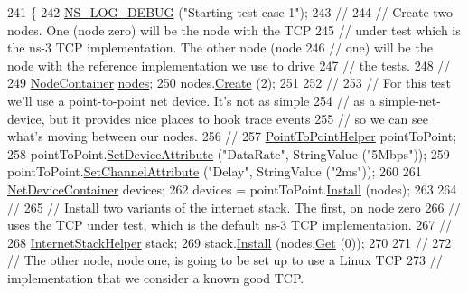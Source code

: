 \begin{DoxyCode}
241 \{
242   \hyperlink{group__logging_ga413f1886406d49f59a6a0a89b77b4d0a}{NS\_LOG\_DEBUG} (\textcolor{stringliteral}{"Starting test case 1"});
243   \textcolor{comment}{//}
244   \textcolor{comment}{// Create two nodes.  One (node zero) will be the node with the TCP}
245   \textcolor{comment}{// under test which is the ns-3 TCP implementation.  The other node (node}
246   \textcolor{comment}{// one) will be the node with the reference implementation we use to drive}
247   \textcolor{comment}{// the tests.}
248   \textcolor{comment}{//}
249   \hyperlink{classns3_1_1NodeContainer}{NodeContainer} \hyperlink{visualizer-ideas_8txt_a3e1b3808014a2c68ab0cd0182e041be2}{nodes};
250   nodes.\hyperlink{classns3_1_1NodeContainer_a787f059e2813e8b951cc6914d11dfe69}{Create} (2);
251 
252   \textcolor{comment}{//}
253   \textcolor{comment}{// For this test we'll use a point-to-point net device.  It's not as simple}
254   \textcolor{comment}{// as a simple-net-device, but it provides nice places to hook trace events}
255   \textcolor{comment}{// so we can see what's moving between our nodes.}
256   \textcolor{comment}{//}
257   \hyperlink{classns3_1_1PointToPointHelper}{PointToPointHelper} pointToPoint;
258   pointToPoint.\hyperlink{classns3_1_1PointToPointHelper_a4577f5ab8c387e5528af2e0fbab1152e}{SetDeviceAttribute} (\textcolor{stringliteral}{"DataRate"}, StringValue (\textcolor{stringliteral}{"5Mbps"}));
259   pointToPoint.\hyperlink{classns3_1_1PointToPointHelper_a6b5317fd17fb61e5a53f8d66a90b63b9}{SetChannelAttribute} (\textcolor{stringliteral}{"Delay"}, StringValue (\textcolor{stringliteral}{"2ms"}));
260 
261   \hyperlink{classns3_1_1NetDeviceContainer}{NetDeviceContainer} devices;
262   devices = pointToPoint.\hyperlink{classns3_1_1PointToPointHelper_ab9162fea3e88722666fed1106df1f9ec}{Install} (nodes);
263 
264   \textcolor{comment}{//}
265   \textcolor{comment}{// Install two variants of the internet stack.  The first, on node zero }
266   \textcolor{comment}{// uses the TCP under test, which is the default ns-3 TCP implementation.}
267   \textcolor{comment}{//}
268   \hyperlink{classns3_1_1InternetStackHelper}{InternetStackHelper} stack;
269   stack.\hyperlink{classns3_1_1InternetStackHelper_a6645b412f31283d2d9bc3d8a95cebbc0}{Install} (nodes.\hyperlink{classns3_1_1NodeContainer_a9ed96e2ecc22e0f5a3d4842eb9bf90bf}{Get} (0));
270 
271   \textcolor{comment}{//}
272   \textcolor{comment}{// The other node, node one, is going to be set up to use a Linux TCP}
273   \textcolor{comment}{// implementation that we consider a known good TCP.}

\end{DoxyCode}
